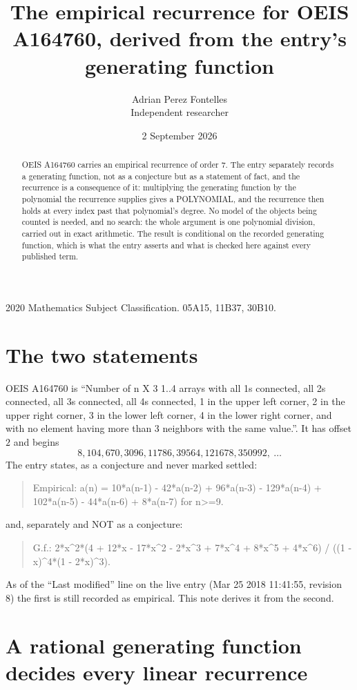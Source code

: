 \documentclass[11pt,a4paper]{article}
\title{The empirical recurrence for OEIS A164760, derived from the entry's generating function}
\author{Adrian Perez Fontelles\\ \small Independent researcher}
\date{2 September 2026}
\theoremstyle{plain}
\theoremstyle{definition}
\begin{document}
\maketitle

\begin{abstract}
OEIS A164760 carries an empirical recurrence of order $7$. The entry separately records a
generating function, not as a conjecture but as a statement of fact, and the recurrence is a
consequence of it: multiplying the generating function by the polynomial the recurrence
supplies gives a POLYNOMIAL, and the recurrence then holds at every index past that
polynomial's degree. No model of the objects being counted is needed, and no search: the
whole argument is one polynomial division, carried out in exact arithmetic. The result is
conditional on the recorded generating function, which is what the entry asserts and what is
checked here against every published term.
\end{abstract}

\noindent\small 2020 Mathematics Subject Classification. 05A15, 11B37, 30B10.\normalsize

\section{The two statements}

OEIS A164760 is ``Number of n X 3 1..4 arrays with all 1s connected, all 2s connected, all 3s connected, all 4s connected, 1 in the upper left corner, 2 in the upper right corner, 3 in the lower left corner, 4 in the lower right corner, and with no element having more than 3 neighbors with the same value.''. It has offset $2$ and begins
\[
8, 104, 670, 3096, 11786, 39564, 121678, 350992,\ \dots
\]
The entry states, as a conjecture and never marked settled:
\begin{quote}
Empirical: a(n) = 10*a(n-1) - 42*a(n-2) + 96*a(n-3) - 129*a(n-4) + 102*a(n-5) - 44*a(n-6) + 8*a(n-7) for n>=9.
\end{quote}
and, separately and NOT as a conjecture:
\begin{quote}
G.f.: 2*x\^{}2*(4 + 12*x - 17*x\^{}2 - 2*x\^{}3 + 7*x\^{}4 + 8*x\^{}5 + 4*x\^{}6) / ((1 - x)\^{}4*(1 - 2*x)\^{}3).
\end{quote}
As of the ``Last modified'' line on the live entry (Mar 25 2018 11:41:55, revision 8) the first is still
recorded as empirical. This note derives it from the second.

\section{A rational generating function decides every linear recurrence}
\end{document}
